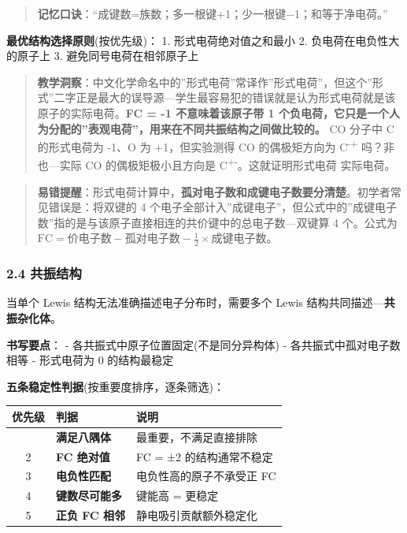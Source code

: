 \begin{quote}
\textbf{记忆口诀}：``成键数=族数；多一根键+1；少一根键−1；和等于净电荷。''
\end{quote}

\textbf{最优结构选择原则}(按优先级)：
1. 形式电荷绝对值之和最小
2. 负电荷在电负性大的原子上
3. 避免同号电荷在相邻原子上

\begin{quote}
\textbf{教学洞察}：中文化学命名中的''形式电荷''常译作''形式电荷''，但这个''形式''二字正是最大的误导源---学生最容易犯的错误就是认为形式电荷就是该原子的实际电荷。\textbf{FC = -1 不意味着该原子带 1 个负电荷，它只是一个人为分配的''表观电荷''，用来在不同共振结构之间做比较的。} CO 分子中 C 的形式电荷为 -1、O 为 +1，但实验测得 CO 的偶极矩方向为 C\textsuperscript{-}\textsuperscript{+} 吗？非也---实际 CO 的偶极矩极小且方向是 C\textsuperscript{+}\textsuperscript{-}。这就证明形式电荷  实际电荷。
\end{quote}

\begin{quote}
\textbf{易错提醒}：形式电荷计算中，\textbf{孤对电子数和成键电子数要分清楚}。初学者常见错误是：将双键的 4 个电子全部计入''成键电子''，但公式中的''成键电子数''指的是与该原子直接相连的共价键中的总电子数---双键算 4 个。公式为 \(\text{FC} = \text{价电子数} - \text{孤对电子数} - \frac{1}{2} \times \text{成键电子数}\)。
\end{quote}

\subsubsection{2.4 共振结构}\label{ux5171ux632fux7ed3ux6784}

当单个 Lewis 结构无法准确描述电子分布时，需要多个 Lewis 结构共同描述---\textbf{共振杂化体}。

\textbf{书写要点}：
- 各共振式中原子位置固定(不是同分异构体)
- 各共振式中孤对电子数相等
- 形式电荷为 0 的结构最稳定

\textbf{五条稳定性判据}(按重要度排序，逐条筛选)：

{\def\LTcaptype{none} %
\begin{longtable}[]{@{}cll@{}}
\toprule\noalign{}
优先级 & 判据 & 说明 \\
\midrule\noalign{}
\endhead
\bottomrule\noalign{}
\endlastfoot
1 & \textbf{满足八隅体} & 最重要，不满足直接排除 \\
2 & \textbf{FC 绝对值  1} & FC = ±2 的结构通常不稳定 \\
3 & \textbf{电负性匹配} & 电负性高的原子不承受正 FC \\
4 & \textbf{键数尽可能多} & 键能高 = 更稳定 \\
5 & \textbf{正负 FC 相邻} & 静电吸引贡献额外稳定化 \\
\end{longtable}
}

